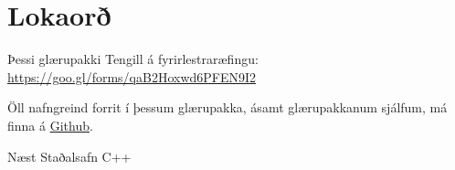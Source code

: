 \documentclass[handout]{beamer}
\begin{document}
\section{Lokaorð}

\begin{frame}{Þessi glærupakki}
Tengill á fyrirlestraræfingu: \url{https://goo.gl/forms/qaB2Hoxwd6PFEN9I2}
\vspace{1cm}

Öll nafngreind forrit í þessum glærupakka, ásamt glærupakkanum sjálfum, má finna á  \href{https://github.com/Ernir/kennsluefni/tree/master/T2/Code/w2}{Github}.

\end{frame}


\begin{frame}{Næst}
Staðalsafn C++
\end{frame}
\end{document}
